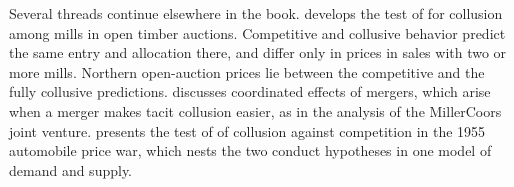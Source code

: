 Several threads continue elsewhere in the book.  develops the test of
\citet{AtheyLevinSeira2011} for collusion among mills in open timber auctions. Competitive and collusive behavior
predict the same entry and allocation there, and differ only in prices in sales with two or more mills. Northern
open-auction prices lie between the competitive and the fully collusive predictions.
 discusses coordinated effects of mergers, which arise when a merger makes tacit collusion easier,
as in the analysis of the MillerCoors joint venture.  presents the test of \citet{Bresnahan1987}
of collusion against competition in the 1955 automobile price war, which nests the two conduct hypotheses in one
model of demand and supply.
